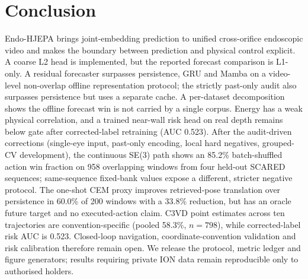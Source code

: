 \documentclass[preprint,12pt]{elsarticle}
\begin{document}
\section{Conclusion}
Endo-HJEPA brings joint-embedding prediction to unified
cross-orifice endoscopic video and makes the boundary between prediction and
physical control explicit. A coarse L2 head is implemented, but the reported
forecast comparison is L1-only.
A residual forecaster surpasses persistence, GRU and Mamba on a video-level
non-overlap offline representation protocol; the strictly past-only audit also
surpasses persistence but uses a separate cache. A per-dataset decomposition
shows the offline forecast win is not carried by a single corpus. Energy has a
weak physical correlation, and a trained near-wall risk head on real depth
remains below gate after corrected-label retraining (AUC 0.523).
After the audit-driven corrections (single-eye input, past-only encoding,
local hard negatives, grouped-CV development), the continuous SE(3) path
shows an 85.2\% batch-shuffled action win fraction on 958 overlapping windows
from four held-out SCARED sequences; same-sequence fixed-bank values expose a
different, stricter negative protocol. The one-shot CEM proxy improves
retrieved-pose translation over persistence in 60.0\% of 200 windows with a
33.8\% reduction, but has an oracle future target and no executed-action
claim. C3VD point estimates across ten trajectories are convention-specific
(pooled 58.3\%, $n{=}798$), while corrected-label risk AUC is 0.523.
Closed-loop navigation, coordinate-convention validation and risk
calibration therefore remain open. We release the protocol, metric ledger and
figure generators; results requiring private ION data remain reproducible only
to authorised holders.
\end{document}
